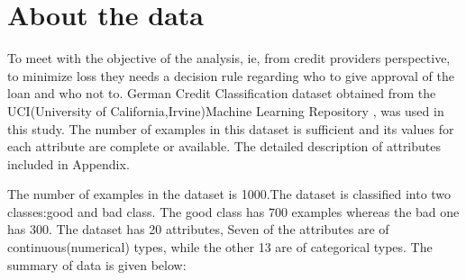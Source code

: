 \documentclass{article}\usepackage[]{graphicx}\usepackage[]{color}
\begin{document}
\section{About the data} \hspace{0.5cm} To meet with the objective of the analysis, ie, from credit providers perspective, to minimize loss they needs a decision rule regarding who to give approval of the loan and who not to. German Credit Classification dataset obtained from the UCI(University of California,Irvine)Machine Learning Repository \cite{[2]}, was used in this study. The number of examples in this dataset is sufficient and its values for each attribute are complete or available. The detailed description of attributes included in Appendix.\par
The number of examples in the dataset is 1000.The dataset is classified into two classes:good and bad class. The good class has 700 examples whereas the bad one has 300. The dataset has 20 attributes, Seven of the attributes are of continuous(numerical) types, while the other 13 are of categorical types. The summary of data is given below:\\
\end{document}
